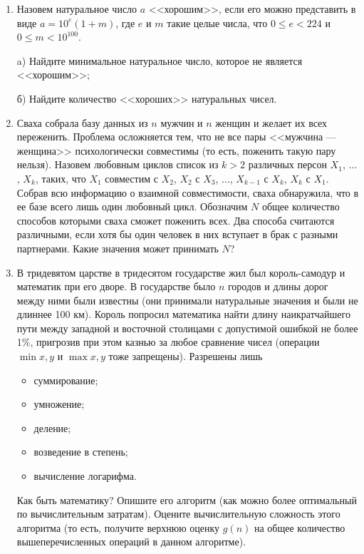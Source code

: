 \begin{enumerate}
\item Назовем натуральное число $a$ <<хорошим>>, если его можно представить в виде $a = 10^e (1+m)$, где $e$ и $m$ такие целые числа, что $0 \leqslant e < 224$ и $0 \leqslant m < 10^{100}$.

a) Найдите минимальное натуральное число, которое не является <<хорошим>>;

б) Найдите количество <<хороших>> натуральных чисел.

\item Сваха собрала базу данных из $n$ мужчин и $n$ женщин и желает их всех
переженить. Проблема осложняется тем, что не все пары <<мужчина --- женщина>> психологически совместимы (то есть, поженить такую пару нельзя). Назовем любовным циклов список из $k > 2$ различных персон $X_1$, $\dots$, $X_k$, таких, что $X_1$ совместим с $X_2$, $X_2$ с $X_3$, $\dots$, $X_{k-1}$ с $X_k$, $X_k$ с $X_1$. Собрав всю информацию о взаимной совместимости, сваха обнаружила, что в ее базе всего лишь один любовный цикл. Обозначим $N$ общее количество способов которыми сваха сможет поженить всех. Два способа считаются различными, если хотя бы один человек в них вступает в брак с разными партнерами. Какие значения может принимать $N$?

\item В тридевятом царстве в тридесятом государстве жил был король-самодур и математик при его дворе. В государстве было $n$ городов и длины дорог между ними были известны (они принимали натуральные значения и были не длиннее 100 км). Король попросил математика найти длину наикратчайшего пути между западной и восточной столицами с допустимой ошибкой не более 1\%, пригрозив при этом казнью за любое сравнение чисел (операции $\min{x, y}$ и $\max{x, y}$ тоже запрещены). Разрешены лишь 
\begin{itemize}
\item суммирование;
\item умножение;
\item деление;
\item возведение в степень;
\item вычисление логарифма.
\end{itemize}
Как быть математику? Опишите его алгоритм (как можно более оптимальный по вычислительным затратам). Оцените вычислительную сложность этого алгоритма (то есть, получите верхнюю оценку $g(n)$ на общее количество вышеперечисленных операций в данном алгоритме).


\end{enumerate}
